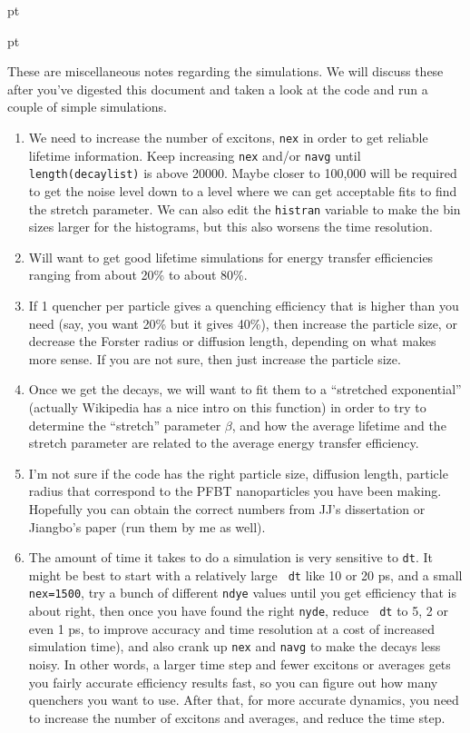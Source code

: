 \documentclass[12pt]{article}
\begin{document}
 pt

  pt

These are miscellaneous notes regarding the simulations.  We will
discuss these after you've digested this document and taken a look at
the code and run a couple of simple simulations.

\begin{enumerate}

\item We need to increase the number of excitons, {\tt nex} in order to get reliable
lifetime information.  Keep increasing {\tt nex} and/or {\tt navg}
until {\tt length(decaylist)} is above 20000.  Maybe closer to 100,000
will be required to get the noise level down to a level where we can
get acceptable fits to find the stretch parameter.  We can also edit
the {\tt histran} variable to make the bin sizes larger for the
histograms, but this also worsens the time resolution.

\item Will want to get good lifetime simulations for energy transfer
efficiencies ranging from about 20\% to about 80\%.

\item If 1 quencher per particle gives a quenching efficiency that is
  higher than you need (say, you want 20\% but it gives 40\%), then
  increase the particle size, or decrease the Forster radius or
  diffusion length, depending on what makes more sense.  If you are
  not sure, then just increase the particle size.

\item Once we get the decays, we will want to fit them to a
  ``stretched exponential'' (actually Wikipedia has a nice intro on
  this function) in order to try to determine the ``stretch''
  parameter $\beta$, and how the average lifetime and the stretch
  parameter are related to the average energy transfer efficiency.

\item I'm not sure if the code has the right particle size, diffusion
  length, particle radius that correspond to the PFBT nanoparticles
  you have been making.  Hopefully you can obtain the correct numbers
  from JJ's dissertation or Jiangbo's paper (run them by me as well).

\item The amount of time it takes to do a simulation is very sensitive
  to {\tt dt}.  It might be best to start with a relatively large {\tt
    dt} like 10 or 20 ps, and a small {\tt nex=1500}, try a bunch of
  different {\tt ndye} values until you get efficiency that is about
  right, then once you have found the right {\tt nyde}, reduce {\tt
    dt} to 5, 2 or even 1 ps, to improve accuracy and time resolution
  at a cost of increased simulation time), and also crank up {\tt nex}
  and {\tt navg} to make the decays less noisy.  In other words, a
  larger time step and fewer excitons or averages gets you fairly
  accurate efficiency results fast, so you can figure out how many
  quenchers you want to use. After that, for more accurate dynamics,
  you need to increase the number of excitons and averages, and reduce
  the time step.


\end{enumerate}
\end{document}
